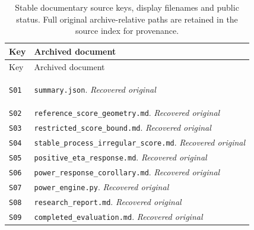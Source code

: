 \begin{longtable}{@{}>{\raggedright\arraybackslash}p{}>{\raggedright\arraybackslash}p{}@{}}
\caption{Stable documentary source keys, display filenames and public status. Full original archive-relative paths are retained in the source index for provenance.}\label{tab:source-keys}\\
\toprule Key & Archived document \\ \midrule\endfirsthead
\toprule Key & Archived document \\ \midrule\endhead
\hypertarget{S01}{}\label{source:S01}\texttt{S01} & \nolinkurl{summary.json}. \textit{Recovered original} \\
\hypertarget{S02}{}\label{source:S02}\texttt{S02} & \nolinkurl{reference_score_geometry.md}. \textit{Recovered original} \\
\hypertarget{S03}{}\label{source:S03}\texttt{S03} & \nolinkurl{restricted_score_bound.md}. \textit{Recovered original} \\
\hypertarget{S04}{}\label{source:S04}\texttt{S04} & \nolinkurl{stable_process_irregular_score.md}. \textit{Recovered original} \\
\hypertarget{S05}{}\label{source:S05}\texttt{S05} & \nolinkurl{positive_eta_response.md}. \textit{Recovered original} \\
\hypertarget{S06}{}\label{source:S06}\texttt{S06} & \nolinkurl{power_response_corollary.md}. \textit{Recovered original} \\
\hypertarget{S07}{}\label{source:S07}\texttt{S07} & \nolinkurl{power_engine.py}. \textit{Recovered original} \\
\hypertarget{S08}{}\label{source:S08}\texttt{S08} & \nolinkurl{research_report.md}. \textit{Recovered original} \\
\hypertarget{S09}{}\label{source:S09}\texttt{S09} & \nolinkurl{completed_evaluation.md}. \textit{Recovered original} \\

\end{longtable}
